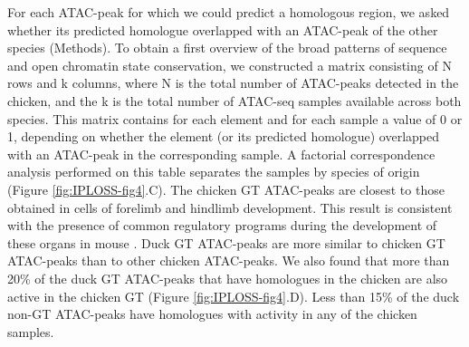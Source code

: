 For each ATAC-peak for which we could predict a homologous region, we asked whether its predicted homologue overlapped with an ATAC-peak of the other species (Methods). To obtain a first overview of the broad patterns of sequence and open chromatin state conservation, we constructed a matrix consisting of N rows and k columns, where N is the total number of ATAC-peaks detected in the chicken, and the k is the total number of ATAC-seq samples available across both species. This matrix contains for each element and for each sample a value of 0 or 1, depending on whether the element (or its predicted homologue) overlapped with an ATAC-peak in the corresponding sample. A factorial correspondence analysis performed on this table separates the samples by species of origin (Figure \ref{fig:IPLOSS-fig4}.C). The chicken GT ATAC-peaks are closest to those obtained in cells of forelimb and hindlimb development. This result is consistent with the presence of common regulatory programs during the development of these organs in mouse \citep{lonfat_convergent_2014}. Duck GT ATAC-peaks are more similar to chicken GT ATAC-peaks than to other chicken ATAC-peaks. We also found that more than 20\% of the duck GT ATAC-peaks that have homologues in the chicken are also active in the chicken GT (Figure \ref{fig:IPLOSS-fig4}.D). Less than 15\% of the duck non-GT ATAC-peaks have homologues with activity in any of the chicken samples.

